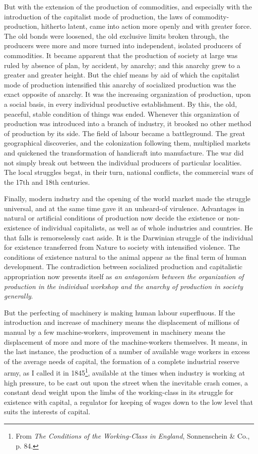 But with the extension of the production of commodities, and especially with the
introduction of the capitalist mode of production, the laws of
commodity-production, hitherto latent, came into action more openly and with
greater force. The old bonds were loosened, the old exclusive limits broken
through, the producers were more and more turned into independent, isolated
producers of commodities. It became apparent that the production of society at
large was ruled by absence of plan, by accident, by anarchy; and this anarchy
grew to a greater and greater height. But the chief means by aid of which the
capitalist mode of production intensified this anarchy of socialized production
was the exact opposite of anarchy. It was the increasing organization of
production, upon a social basis, in every individual productive establishment.
By this, the old, peaceful, stable condition of things was ended. Whenever this
organization of production was introduced into a branch of industry, it brooked
no other method of production by its side. The field of labour became a
battleground. The great geographical discoveries, and the colonization following
them, multiplied markets and quickened the transformation of handicraft into
manufacture. The war did not simply break out between the individual producers
of particular localities. The local struggles begat, in their turn, national
conflicts, the commercial wars of the 17th and 18th centuries.

Finally, modern industry and the opening of the world market made the struggle
universal, and at the same time gave it an unheard-of virulence. Advantages in
natural or artificial conditions of production now decide the existence or
non-existence of individual capitalists, as well as of whole industries and
countries. He that falls is remorselessly cast aside. It is the Darwinian
struggle of the individual for existence transferred from Nature to society with
intensified violence. The conditions of existence natural to the animal appear
as the final term of human development. The contradiction between socialized
production and capitalistic appropriation now presents itself as \emph{an
antagonism between the organization of production in the individual workshop and
the anarchy of production in society generally}.

But the perfecting of machinery is making human labour superfluous. If the
introduction and increase of machinery means the displacement of millions of
manual by a few machine-workers, improvement in machinery means the displacement
of more and more of the machine-workers themselves. It means, in the last
instance, the production of a number of available wage workers in excess of the
average needs of capital, the formation of a complete industrial reserve army,
as I called it in 1845\footnote{
  From \emph{The Conditions of the Working-Class in England}, Sonnenschein \&
Co., p. 84.
}, available at the times when industry is working at high pressure, to be cast
out upon the street when the inevitable crash comes, a constant dead weight upon
the limbs of the working-class in its struggle for existence with capital, a
regulator for keeping of wages down to the low level that suits the interests of
capital.

